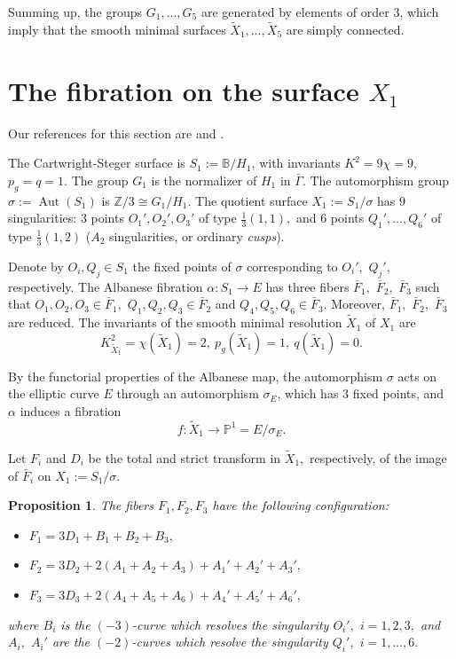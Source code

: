 \documentclass[10pt,a4paper]{article}
\DeclareMathOperator{\Aut}{Aut}
\newcommand{\PP}{\mathbb{P}}
\newcommand{\ZZ}{\mathbb{Z}}
\newtheorem{proposition}[theorem]{Proposition}
\begin{document}
Summing up, the groups $G_1,\ldots,G_5$ are generated by elements of order 3,
which imply that the smooth minimal surfaces $\tilde X_1,\ldots,\tilde X_5$ are simply connected.


\section{The fibration on the surface $X_1$}\label{CSsurface}

Our references for this section are \cite{CS} and \cite{CKYshort}.

The Cartwright-Steger surface is $S_1:=\mathbb B/H_1$, with invariants 
$K^2=9\chi=9,$ $p_{g}=q=1.$
The group $G_1$ is the normalizer of $H_1$ in $\bar\Gamma.$
The automorphism group $\sigma:=\Aut(S_1)$ is $\ZZ/3\cong G_1/H_1.$
The quotient surface $X_1:=S_1/\sigma$ has $9$ singularities:
$3$ points $O_{1}',O_{2}',O_{3}'$ of type $\frac{1}{3}(1,1),$
and $6$ points $Q_{1}',\ldots,Q_{6}'$ of type $\frac{1}{3}(1,2)$
($A_{2}$ singularities, or ordinary {\em cusps}).

Denote by $O_i, Q_j\in S_1$ the fixed points of $\sigma$ corresponding to $O_i',$ $Q_j',$ respectively.
The Albanese fibration $\alpha:S_1\to E$ has three fibers $\bar F_1,$ $\bar F_2,$ $\bar F_3$
such that $O_1,O_2,O_3\in\bar F_1,$ $Q_1,Q_2,Q_3\in\bar F_2$ and $Q_4,Q_5,Q_6\in\bar F_3.$
Moreover, $\bar F_1,$ $\bar F_2,$ $\bar F_3$ are reduced.
The invariants of the smooth minimal resolution $\tilde X_{1}$ of $X_1$ are
\[K_{\tilde X_{1}}^2=\chi(\tilde X_{1})=2,\ p_g(\tilde X_{1})=1,\ q(\tilde X_{1})=0.\]


By the functorial properties of the Albanese map, the automorphism
$\sigma$ acts on the elliptic curve $E$ through an automorphism
$\sigma_{E}$, which has $3$ fixed points, and $\alpha$ induces a fibration
\[f:\tilde X_{1}\longrightarrow\PP^{1}=E/\sigma_{E}.\]

Let $F_{i}$ and $D_i$ be the total and strict transform in $\tilde X_1,$ respectively,
of the image of $\bar F_i$ on $X_1:=S_1/\sigma.$

\begin{proposition}
\label{thm:The-fibration-}
The fibers $F_{1},F_{2},F_{3}$ have the following configuration:
\begin{itemize}
\item $F_{1}=3D_{1}+B_{1}+B_{2}+B_{3},$
\item $F_{2}=3D_{2}+2(A_{1}+A_{2}+A_{3})+A_{1}'+A_{2}'+A_{3}',$
\item $F_{3}=3D_{3}+2(A_4+A_5+A_6)+A_4'+A_5'+A_6',$
\end{itemize}
where $B_i$ is the $(-3)$-curve which resolves the singularity $O_i',$ $i=1,2,3,$ and
$A_i,$ $A_i'$ are the $(-2)$-curves which resolve the singularity $Q_i',$ $i=1,\ldots,6.$
\end{proposition}
\end{document}
